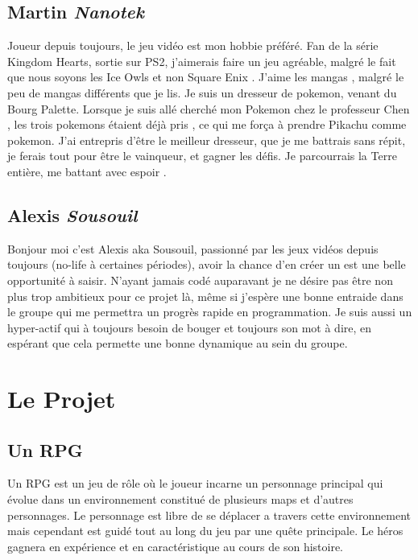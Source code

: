 \documentclass[12pt,a4paper]{article}
\begin{document}
  \subsection{Martin \textit{Nanotek}}
Joueur depuis toujours, le jeu vidéo est mon hobbie préféré. Fan de la série Kingdom Hearts, sortie sur PS2, j'aimerais faire un jeu agréable, malgré le fait que nous soyons les Ice Owls et non Square Enix . J'aime les mangas , malgré le peu de mangas différents que je lis. Je suis un dresseur de pokemon, venant du Bourg Palette. Lorsque je suis allé cherché mon Pokemon chez le professeur Chen , les trois pokemons étaient déjà pris , ce qui me força à prendre Pikachu comme pokemon. J'ai entrepris d'être le meilleur dresseur, que je me battrais sans répit, je ferais tout pour être le vainqueur, et gagner les défis. Je parcourrais la Terre entière, me battant avec espoir .

  \subsection{Alexis \textit{Sousouil}}

Bonjour moi c'est Alexis aka Sousouil, passionné par les jeux vidéos depuis toujours (no-life à certaines périodes), avoir la chance d'en créer un est une belle opportunité à saisir. N'ayant jamais codé auparavant je ne désire pas être non plus trop ambitieux pour ce projet là, même si j'espère une bonne entraide dans le groupe qui me permettra un progrès rapide en programmation.
Je suis aussi un hyper-actif qui à toujours besoin de bouger et toujours son mot à dire, en espérant que cela permette une bonne dynamique au sein du groupe.

\newpage

\section{Le Projet}
      \subsection{Un RPG}
Un RPG est un jeu de rôle où le joueur incarne un personnage principal qui évolue dans un environnement constitué de plusieurs maps et d'autres personnages. Le personnage est libre de se déplacer a travers cette environnement mais cependant est guidé tout au long du jeu par une quête principale. Le héros gagnera en expérience et en caractéristique au cours de son histoire.\\
\end{document}
